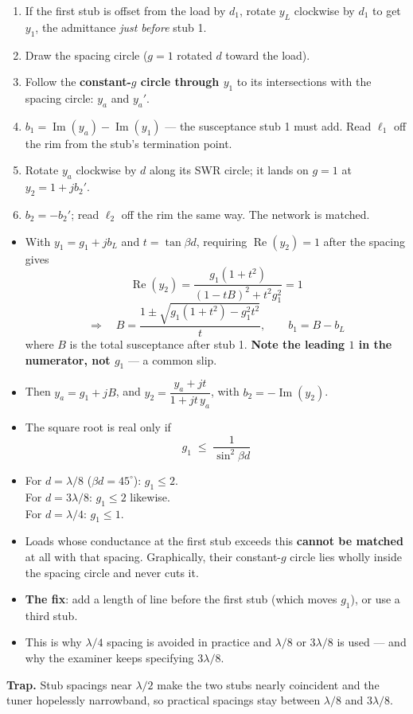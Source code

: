 {\begin{enumerate}[label=\arabic*., leftmargin=1.4em]
  \item If the first stub is offset from the load by $d_1$, rotate $y_L$ clockwise by $d_1$
    to get $y_1$, the admittance \emph{just before} stub 1.
  \item Draw the spacing circle ($g=1$ rotated $d$ toward the load).
  \item Follow the \textbf{constant-$g$ circle through $y_1$} to its intersections with the
    spacing circle: $y_a$ and $y_a'$.
  \item $b_1 = \operatorname{Im}(y_a) - \operatorname{Im}(y_1)$ --- the susceptance stub 1
    must add. Read $\ell_1$ off the rim from the stub's termination point.
  \item Rotate $y_a$ clockwise by $d$ along its SWR circle; it lands on $g=1$ at
    $y_2 = 1 + jb_2'$.
  \item $b_2 = -b_2'$; read $\ell_2$ off the rim the same way. The network is matched.
\end{enumerate}}{%
\begin{itemize}
  \item With $y_1 = g_1 + jb_L$ and $t = \tan\beta d$, requiring
    $\operatorname{Re}(y_2)=1$ after the spacing gives
    \[ \operatorname{Re}(y_2) = \frac{g_1(1+t^2)}{(1-tB)^2 + t^2g_1^2} = 1 \]
    \[ \Rightarrow \quad B = \frac{1 \pm \sqrt{g_1(1+t^2) - g_1^2t^2}}{t},
       \qquad b_1 = B - b_L \]
    where $B$ is the total susceptance after stub 1. \textbf{Note the leading $1$ in the
    numerator, not $g_1$} --- a common slip.
  \item Then $y_a = g_1 + jB$, and
    $y_2 = \dfrac{y_a + jt}{1 + jt\,y_a}$, with $b_2 = -\operatorname{Im}(y_2)$.
\end{itemize}
\begin{itemize}
  \item The square root is real only if
    \[ g_1 \;\le\; \frac{1}{\sin^2\beta d} \]
  \item For $d = \lambda/8$ ($\beta d = 45^\circ$): $g_1 \le 2$.
    \\ \mbox{}\hfill For $d = 3\lambda/8$: $g_1 \le 2$ likewise.
    \\ \mbox{}\hfill For $d = \lambda/4$: $g_1 \le 1$.
  \item Loads whose conductance at the first stub exceeds this \textbf{cannot be matched}
    at all with that spacing. Graphically, their constant-$g$ circle lies wholly inside the
    spacing circle and never cuts it.
  \item \textbf{The fix}: add a length of line before the first stub (which moves $g_1$), or
    use a third stub.
  \item This is why $\lambda/4$ spacing is avoided in practice and $\lambda/8$ or
    $3\lambda/8$ is used --- and why the examiner keeps specifying $3\lambda/8$.
\end{itemize}
\vspace{2pt}
{\footnotesize\color{sub}\textbf{Trap.} Stub spacings near $\lambda/2$ make the two stubs
nearly coincident and the tuner hopelessly narrowband, so practical spacings stay between
$\lambda/8$ and $3\lambda/8$.}}

